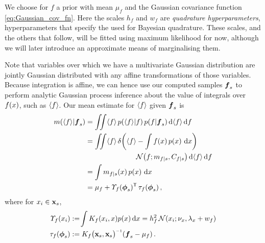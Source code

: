 \documentclass{article}
\begin{document}
We choose for $f$ a \gpb prior with mean $\mu_f$ and the Gaussian covariance function \eqref{eq:Gaussian_cov_fn}. Here the scales $h_f$ and $w_f$ are \emph{quadrature hyperparameters}, hyperparameters that specify the  \gpb used for Bayesian quadrature. These scales, and the others that follow, will be fitted using maximum likelihood for now, although we will later introduce an approximate means of marginalising them.


Note that variables over which we have a multivariate Gaussian distribution are jointly Gaussian distributed with any affine transformations of those variables. Because integration is affine, we can hence use our computed samples $\vf_s$ to perform analytic Gaussian process inference about the value of integrals over $f(\lfv)$, such as $\inty{f}$. Our mean estimate for $\inty{f}$ given $\vf_s$ is
%
\begin{align} \label{eq:mean_inty_f}
\mean{\inty{f}}{\vf_s}
& 
=\iint \inty{f}\,\p{\inty{f}}{f}\p{f}{\vf_s} \ud \inty{f} \,\ud f                                                                                                                                                               \nonumber\\
&
 =\iint \inty{f}\,\dd{\inty{f}}{\int f(\lfv)\,\po{\lfv}\,\ud\lfv}
\nonumber\\
&\hspace{2.5cm}
\N{f}{\meancondfn{f}{s}}{C_{f|s}} \ud \inty{f} \,\ud f \nonumber\\
&
 = \int \meancondfn{f}{s}(\lfv)\,\po{\lfv}\,\ud\lfv\nonumber\\
&
 = 
\mu_f + \ntT{s}{f}\, \dtt{s}{f}
\,,
\end{align}
where for $\lfv_i \in \vlfv_s$,
\begin{align*}
\fnt{\lfv_i}{f} & \deq \!\int K_f(\lfv_i,\lfv)\po{\lfv}\ud\lfv
 = h_f^2\,\N{\lfv_i}{\nu_{\lfv}}{\lambda_{\lfv}+w_{f}}\\
\dtt{s}{f} & \deq K_{f}\bigl(\vlfv_s,\vlfv_s\bigr)\inv (\vf_s-{\mu}_{f})\,.
\end{align*}
%
\end{document}
